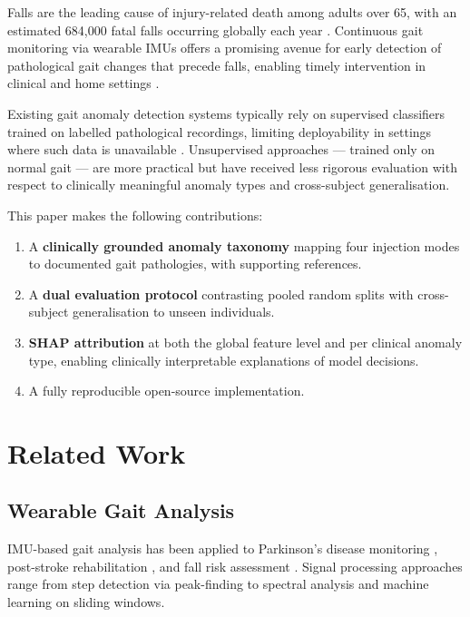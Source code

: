 \documentclass[conference]{IEEEtran}
\begin{document}
Falls are the leading cause of injury-related death among adults over 65,
with an estimated 684,000 fatal falls occurring globally each year
\cite{who_falls}.
Continuous gait monitoring via wearable IMUs offers a promising avenue for
early detection of pathological gait changes that precede falls, enabling
timely intervention in clinical and home settings \cite{tao2012}.

Existing gait anomaly detection systems typically rely on supervised
classifiers trained on labelled pathological recordings, limiting
deployability in settings where such data is unavailable \cite{wang2020}.
Unsupervised approaches — trained only on normal gait — are more practical
but have received less rigorous evaluation with respect to clinically
meaningful anomaly types and cross-subject generalisation.

This paper makes the following contributions:
\begin{enumerate}
  \item A \textbf{clinically grounded anomaly taxonomy} mapping four
        injection modes to documented gait pathologies, with supporting
        references.
  \item A \textbf{dual evaluation protocol} contrasting pooled random
        splits with cross-subject generalisation to unseen individuals.
  \item \textbf{SHAP attribution} at both the global feature level and
        per clinical anomaly type, enabling clinically interpretable
        explanations of model decisions.
  \item A fully reproducible open-source implementation.
\end{enumerate}

\section{Related Work}

\subsection{Wearable Gait Analysis}
IMU-based gait analysis has been applied to Parkinson's disease
monitoring \cite{mazilu2012}, post-stroke rehabilitation \cite{patterson2010},
and fall risk assessment \cite{maki1997}.
Signal processing approaches range from step detection via peak-finding
to spectral analysis and machine learning on sliding windows.
\end{document}
